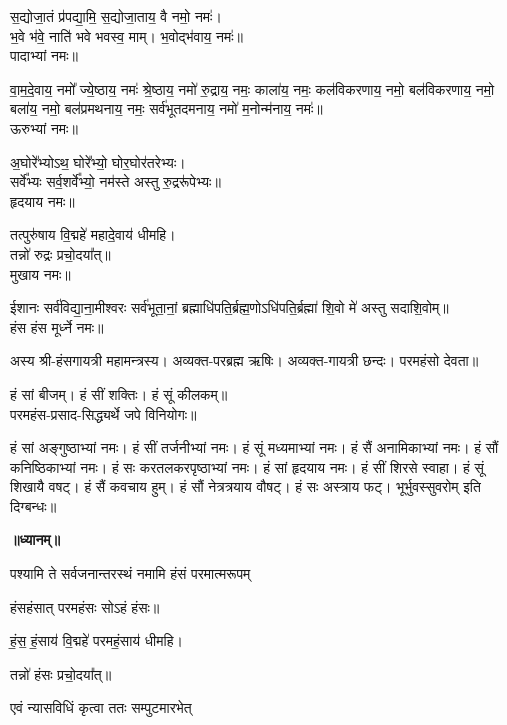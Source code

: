 स॒द्योजा॒तं प्र॑पद्या॒मि॒ स॒द्योजा॒ताय॒ वै नमो॒ नमः॑।\\
भ॒वे भ॑वे॒ नाति॑ भवे भवस्व॒ माम्। भ॒वोद्भ॑वाय॒ नमः॑॥\\
पादाभ्यां नमः॥

वा॒म॒दे॒वाय॒ नमो᳚ ज्ये॒ष्ठाय॒ नमः॑ श्रे॒ष्ठाय॒ नमो॑ रु॒द्राय॒ नमः॒ काला॑य॒ नमः॒ कल॑विकरणाय॒ नमो॒ बल॑विकरणाय॒ नमो॒ बला॑य॒ नमो॒ बल॑प्रमथनाय॒ नमः॒ सर्व॑भूतदमनाय॒ नमो॑ म॒नोन्म॑नाय॒ नमः॑॥\\
ऊरुभ्यां नमः॥

अ॒घोरे᳚भ्योऽथ॒ घोरे᳚भ्यो॒ घोर॒घोर॑तरेभ्यः।\\
सर्वे᳚भ्यः सर्व॒शर्वे᳚भ्यो॒ नम॑स्ते अस्तु रु॒द्ररू॑पेभ्यः॥\\
हृदयाय नमः॥

तत्पुरु॑षाय वि॒द्महे॑ महादे॒वाय॑ धीमहि।\\
तन्नो॑ रुद्रः प्रचो॒दया᳚त्॥\\
मुखाय नमः॥

ईशानः सर्व॑विद्या॒ना॒मीश्वरः सर्व॑भूता॒नां॒ ब्रह्माधि॑पति॒र्ब्रह्म॒णो\-ऽधि॑पति॒र्ब्रह्मा॑ शि॒वो मे॑ अस्तु सदाशि॒वोम्॥\\
हंस हंस मूर्ध्ने नमः॥\\
{\small\closesection}

अस्य श्री-हंसगायत्री महामन्त्रस्य। अव्यक्त-परब्रह्म ऋषिः। अव्यक्त-गायत्री छन्दः। परमहंसो देवता॥

हं सां बीजम्। हं सीं शक्तिः। हं सूं कीलकम्॥\\
परमहंस-प्रसाद-सिद्ध्यर्थे जपे विनियोगः॥

हं सां अङ्गुष्ठाभ्यां नमः।
हं सीं तर्जनीभ्यां नमः।
हं सूं मध्यमाभ्यां नमः।
हं सैं अनामिकाभ्यां नमः।
हं सौं कनिष्ठिकाभ्यां नमः।
हं सः करतलकरपृष्ठाभ्यां नमः।
हं सां हृदयाय नमः।
हं सीं शिरसे स्वाहा।
हं सूं शिखायै वषट्।
हं सैं कवचाय हुम्।
हं सौं नेत्रत्रयाय वौषट्।
हं सः अस्त्राय फट्।
भूर्भुवस्सुवरोम् इति दिग्बन्धः॥

\centerline{\textbf{॥ध्यानम्॥}}

{पश्यामि ते सर्वजनान्तरस्थं नमामि हंसं परमात्मरूपम्}
\smallskip
\centerline{हंसहंसात् परमहंसः सोऽहं हंसः॥}
\smallskip
\centerline{हं॒स॒ हं॒साय॑ वि॒द्महे॑ परमहं॒साय॑ धीमहि।}
\centerline{तन्नो॑ हंसः प्रचो॒दया᳚त्॥ }
\begin{flushright}
\vspace{-5.7ex}{\small (एवं त्रिः)}
\end{flushright}

{एवं न्यासविधिं कृत्वा ततः सम्पुटमारभेत्}


